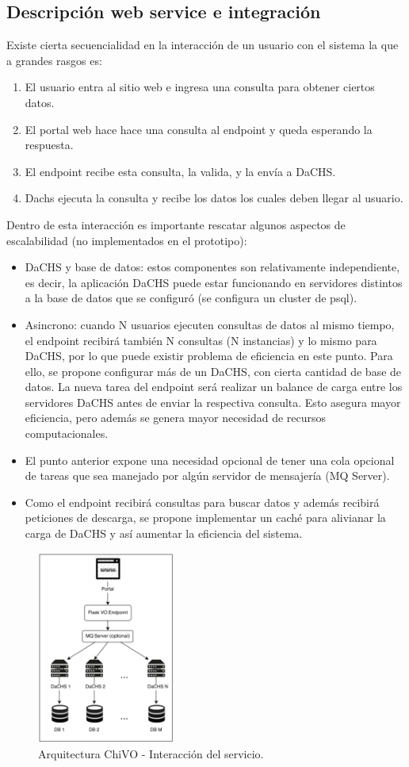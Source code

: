 \subsection{Descripción web service e integración}
Existe cierta secuencialidad en la interacción de un usuario con el sistema la que a grandes rasgos es:
\begin{enumerate}
	\item El usuario entra al sitio web e ingresa una consulta para obtener ciertos datos.
	\item El portal web hace hace una consulta al endpoint y queda esperando la respuesta.
	\item El endpoint recibe esta consulta, la valida, y la envía a DaCHS.
	\item Dachs ejecuta la consulta y recibe los datos los cuales deben llegar al usuario.
\end{enumerate}

Dentro de esta interacción es importante rescatar algunos aspectos de
escalabilidad (no implementados en el prototipo):
\begin{itemize}
	\item DaCHS y base de datos: estos componentes son relativamente
independiente, es decir, la aplicación DaCHS puede estar funcionando en
servidores distintos a la base de datos que se configuró (se configura un
cluster de psql).
	\item Asincrono: cuando N usuarios ejecuten consultas de datos al mismo
tiempo, el endpoint recibirá también N consultas (N instancias) y lo mismo para
DaCHS, por lo que puede existir problema de eficiencia en este punto. Para
ello, se propone configurar más de un DaCHS, con cierta cantidad de base de
datos. La nueva tarea del endpoint será realizar un balance de carga entre los
servidores DaCHS antes de enviar la respectiva consulta. Esto asegura mayor
eficiencia, pero además se genera mayor necesidad de recursos computacionales.
	\item El punto anterior expone una necesidad opcional de tener una cola
opcional de tareas que sea manejado por algún servidor de mensajería (MQ
Server).
	\item Como el endpoint recibirá consultas para buscar datos y además
recibirá peticiones de descarga, se propone implementar un caché para alivianar
la carga de DaCHS y así aumentar la eficiencia del sistema.
\end{itemize}

\vspace{1.0cm}
\begin{figure}[h!t]
    \begin{center}
        \includegraphics[width=0.4\textwidth]{img/interaccion.png}
        \caption{Arquitectura ChiVO - Interacción del servicio.}
    \end{center}
\end{figure}
